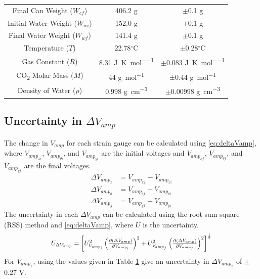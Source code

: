 \documentclass[10pt,journal,letterpaper]{IEEEtran}
\begin{document}
\begin{table}[H]
{\begin{tabular}{ccc}
Final Can Weight ($W_{cf}$) & 406.2 g & $\pm$0.1 g \\
Initial Water Weight ($W_{wi}$) & 152.0 g & $\pm$0.1 g \\
Final Water Weight ($W_{wf}$) & 141.4 g & $\pm$0.1 g \\
Temperature ($T$) & 22.78$^\circ$C & $\pm$0.28$^\circ$C \\
Gas Constant ($R$) \cite{b6} & 8.31 \unit{\joule\per\kelvin\per\mole} & $\pm$0.083 \unit{\joule\per\kelvin\per\mole} \\
CO\textsubscript{2} Molar Mass ($M$) \cite{b4} & 44 \unit{\gram\per\mole} & $\pm$0.44 \unit{\gram\per\mole} \\
Density of Water ($\rho$) \cite{b7} & 0.998 \unit{\gram\per\centi\meter\cubed} & $\pm$0.00998 \unit{\gram\per\centi\meter\cubed} \\
\hline \hline
\end{tabular}}
\label{tab:Uncertainty}
\end{table}

\subsection*{Uncertainty in $\Delta V_{amp}$}

The change in $V_{amp}$ for each strain gauge can be calculated using \eqref{eq:deltaVamp}, where $V_{amp_{xi}}$, $V_{amp_{\theta i}}$, and $V_{amp_{yi}}$ are the initial voltages and $V_{amp_{xf}}$, $V_{amp_{\theta f}}$, and $V_{amp_{yf}}$ are the final voltages.
\begin{subequations}
\label{eq:deltaVamp}
\begin{align}
\Delta V_{amp_{x}}&=V_{amp_{xf}}-V_{amp_{xi}} \\
\Delta V_{amp_{\theta}}&=V_{amp_{\theta f}}-V_{amp_{\theta i}} \\
\Delta V_{amp_{y}}&=V_{amp_{yf}}-V_{amp_{yi}}
\end{align}
\end{subequations}
The uncertainty in each $\Delta V_{amp}$ can be calculated using the root sum square (RSS) method and \eqref{eq:deltaVamp}, where $U$ is the uncertainty.
\begin{equation}
\label{eq:UDeltaVamp}
\resizebox{227pt}{!}{$U_{\Delta V_{amp}}=\left[U_{V_{amp_{i}}}^2 \left(\frac{\partial (\Delta V_{amp})}{\partial V_{amp_{i}}}\right)^2 + U_{V_{amp_{f}}}^2 \left(\frac{\partial (\Delta V_{amp})}{\partial V_{amp_{f}}}\right)^2 \right]^{\frac{1}{2}}$}
\end{equation}
For $V_{amp_{x}}$, using the values given in Table \ref{tab:Uncertainty} give an uncertainty in $\Delta V_{amp_{x}}$ of $\pm$0.27 V.
\end{document}
